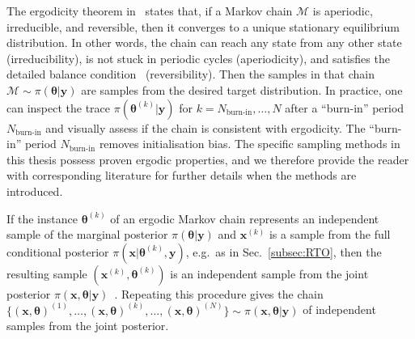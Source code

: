 The ergodicity theorem in~\cite{tan2016LecNot} states that, if a Markov chain $\mathcal{M}$ is aperiodic, irreducible, and reversible, then it converges to a unique stationary equilibrium distribution.
In other words, the chain can reach any state from any other state (irreducibility), is not stuck in periodic cycles (aperiodicity), and satisfies the detailed balance condition~\cite{tan2016LecNot} (reversibility).
Then the samples in that chain $ \mathcal{M} \sim \pi( \bm{\theta} |  \bm{y})$ are samples from the desired target distribution.
In practice, one can inspect the trace $\pi(\bm{\theta}^{(k)} |  \bm{y})$ for $k = N_{\text{burn-in}}, \dots, N$ after a ``burn-in'' period $N_{\text{burn-in}}$ and visually assess if the chain is consistent with ergodicity.
The ``burn-in'' period $N_{\text{burn-in}}$ removes initialisation bias.
The specific sampling methods in this thesis possess proven ergodic properties, and we therefore provide the reader with corresponding literature for further details when the methods are introduced.


If the instance $\bm{\theta}^{(k)}$ of an ergodic Markov chain represents an independent sample of the marginal posterior $\pi(\bm{\theta} | \bm{y})$ and $\bm{x}^{(k)}$ is a sample from the full conditional posterior $ \pi(\bm{x}|   \bm{\theta}^{(k)}, \bm{y})$, e.g.~as in Sec.~\ref{subsec:RTO}, then the resulting sample $(\bm{x}^{(k)}, \bm{\theta}^{(k)})$ is an independent sample from the joint posterior $\pi(\bm{x},   \bm{\theta} | \bm{y})$~\cite{fox2016fast,acosta2022markov}.
Repeating this procedure gives the chain $\{(\bm{x}, \bm{\theta})^{(1)},\dots, (\bm{x}, \bm{\theta})^{(k)} ,\dots, (\bm{x}, \bm{\theta})^{(N)} \} \sim \pi(\bm{x} ,  \bm{\theta} | \bm{y}) $ of independent samples from the joint posterior.

